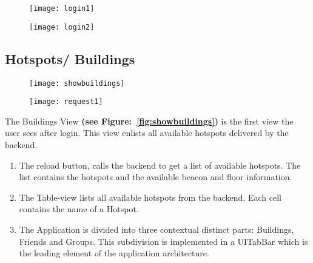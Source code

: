 \begin{figure}
\centering
\begin{minipage}{.5\textwidth}
  \centering
  \texttt{[image: login1]}
  \label{fig:login1}
\end{minipage}%
\begin{minipage}{.5\textwidth}
  \centering
  \texttt{[image: login2]}
  \label{fig:login2}
\end{minipage}
\end{figure}

\subsection{Hotspots/ Buildings}

\begin{figure}
\centering
\begin{minipage}{.5\textwidth}
  \centering
  \texttt{[image: showbuildings]}
  \label{fig:showbuildings}
\end{minipage}%
\begin{minipage}{.5\textwidth}
  \centering
  \texttt{[image: request1]}
  \label{fig:request1}
\end{minipage}
\end{figure}



The Buildings View \textbf{(see Figure:~\ref{fig:showbuildings})} is the first view the user sees after login. This view enlists all available hotspots delivered by the backend.

\begin{enumerate}
  \item The reload button, calls the backend to get a list of available hotspots. The list contains the hotspots and the available beacon and floor information.
  \item The Table-view lists all available hotspots from the backend. Each cell contains the name of a Hotspot.
  \item The Application is divided into three contextual distinct parts: Buildings, Friends and Groups. This subdivision is implemented in a UITabBar which is the leading element of the application architecture.
\end{enumerate}

